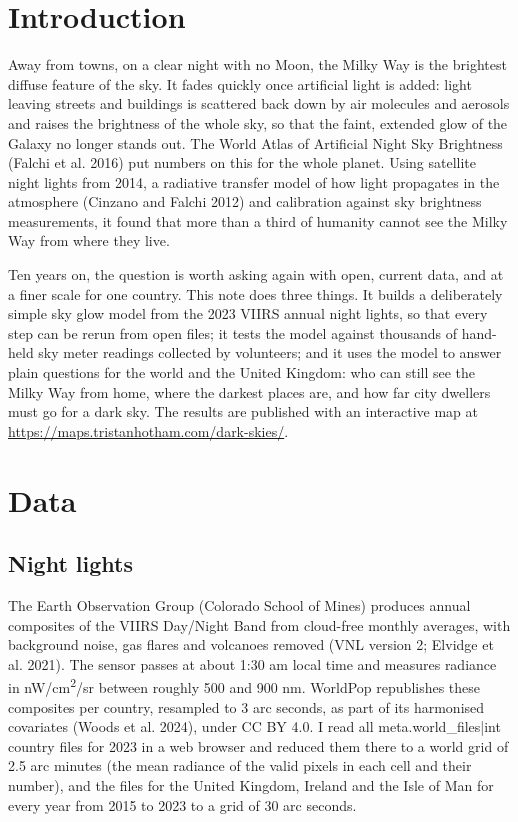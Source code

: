 \documentclass[11pt,a4paper]{article}
\begin{document}
\section{Introduction}

Away from towns, on a clear night with no Moon, the Milky Way is the brightest diffuse feature of the sky. It fades quickly once artificial light is added: light leaving streets and buildings is scattered back down by air molecules and aerosols and raises the brightness of the whole sky, so that the faint, extended glow of the Galaxy no longer stands out. The World Atlas of Artificial Night Sky Brightness (Falchi et al. 2016) put numbers on this for the whole planet. Using satellite night lights from 2014, a radiative transfer model of how light propagates in the atmosphere (Cinzano and Falchi 2012) and calibration against sky brightness measurements, it found that more than a third of humanity cannot see the Milky Way from where they live.

Ten years on, the question is worth asking again with open, current data, and at a finer scale for one country. This note does three things. It builds a deliberately simple sky glow model from the 2023 VIIRS annual night lights, so that every step can be rerun from open files; it tests the model against thousands of hand-held sky meter readings collected by volunteers; and it uses the model to answer plain questions for the world and the United Kingdom: who can still see the Milky Way from home, where the darkest places are, and how far city dwellers must go for a dark sky. The results are published with an interactive map at \url{https://maps.tristanhotham.com/dark-skies/}.

\section{Data}

\subsection{Night lights}
The Earth Observation Group (Colorado School of Mines) produces annual composites of the VIIRS Day/Night Band from cloud-free monthly averages, with background noise, gas flares and volcanoes removed (VNL version 2; Elvidge et al. 2021). The sensor passes at about 1:30 am local time and measures radiance in nW/cm\textsuperscript{2}/sr between roughly 500 and 900 nm. WorldPop republishes these composites per country, resampled to 3 arc seconds, as part of its harmonised covariates (Woods et al. 2024), under CC BY 4.0. I read all {{meta.world_files|int}} country files for 2023 in a web browser and reduced them there to a world grid of 2.5 arc minutes (the mean radiance of the valid pixels in each cell and their number), and the files for the United Kingdom, Ireland and the Isle of Man for every year from 2015 to 2023 to a grid of 30 arc seconds.
\end{document}
